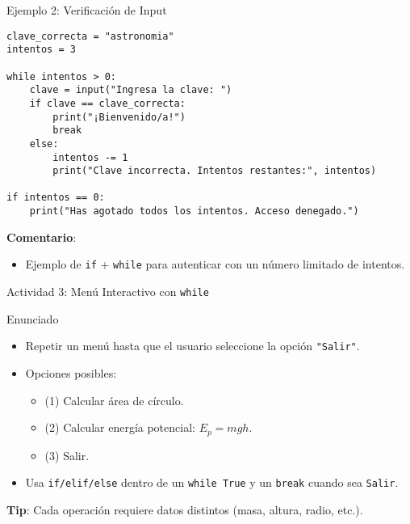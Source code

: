 \documentclass[10pt]{beamer}
\begin{document}
\begin{frame}[fragile]{Ejemplo 2: Verificación de Input}
\begin{verbatim}
clave_correcta = "astronomia"
intentos = 3

while intentos > 0:
    clave = input("Ingresa la clave: ")
    if clave == clave_correcta:
        print("¡Bienvenido/a!")
        break
    else:
        intentos -= 1
        print("Clave incorrecta. Intentos restantes:", intentos)

if intentos == 0:
    print("Has agotado todos los intentos. Acceso denegado.")
\end{verbatim}
\textbf{Comentario}:
\begin{itemize}
  \item Ejemplo de \texttt{if} + \texttt{while} para autenticar con un número limitado de intentos.
\end{itemize}
\end{frame}

\begin{frame}{Actividad 3: Menú Interactivo con \texttt{while}}
  \begin{block}{Enunciado}
    \begin{itemize}
      \item Repetir un menú hasta que el usuario seleccione la opción \texttt{"Salir"}.
      \item Opciones posibles:
        \begin{itemize}
          \item (1) Calcular área de círculo.
          \item (2) Calcular energía potencial: \(E_p = mgh\).
          \item (3) Salir.
        \end{itemize}
      \item Usa \texttt{if/elif/else} dentro de un \texttt{while True} y un \texttt{break} cuando sea \texttt{Salir}.
    \end{itemize}
  \end{block}
  \textbf{Tip}: Cada operación requiere datos distintos (masa, altura, radio, etc.).
\end{frame}
\end{document}
